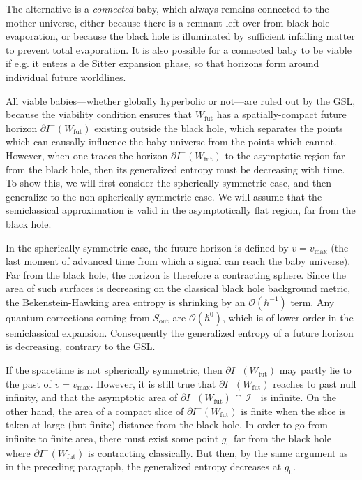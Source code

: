 \documentclass{article}
\begin{document}
The alternative is a \textit{connected} baby, which always remains connected to the mother universe, either because there is a remnant left over from black hole evaporation, or because the black hole is illuminated by sufficient infalling matter to prevent total evaporation.  It is also possible for a connected baby to be viable if e.g. it enters a de Sitter expansion phase, so that horizons form around individual future worldlines.

All viable babies---whether globally hyperbolic or not---are ruled out by the GSL, because the viability condition ensures that $W_\mathrm{fut}$ has a spatially-compact future horizon $\partial I^-(W_\mathrm{fut})$ existing outside the black hole, which separates the points which can causally influence the baby universe from the points which cannot.  However, when one traces the horizon $\partial I^-(W_\mathrm{fut})$ to the asymptotic region far from the black hole, then its generalized entropy must be decreasing with time.  To show this, we will first consider the spherically symmetric case, and then generalize to the non-spherically symmetric case.  We will assume that the semiclassical approximation is valid in the asymptotically flat region, far from the black hole.

In the spherically symmetric case, the future horizon is defined by $v = v_\mathrm{max}$ (the last moment of advanced time from which a signal can reach the baby universe).  Far from the black hole, the horizon is therefore a contracting sphere.  Since the area of such surfaces is decreasing on the classical black hole background metric, the Bekenstein-Hawking area entropy is shrinking by an $\mathcal{O}(\hbar^{-1})$ term.  Any quantum corrections coming from $S_\mathrm{out}$ are $\mathcal{O}(\hbar^{0})$, which is of lower order in the semiclassical expansion.  Consequently the generalized entropy of a future horizon is decreasing, contrary to the GSL.

If the spacetime is not spherically symmetric, then $\partial I^-(W_\mathrm{fut})$ may partly lie to the past of $v = v_\mathrm{max}$.  However, it is still true that $\partial I^-(W_\mathrm{fut})$ reaches to past null infinity, and that the asymptotic area of $\partial I^-(W_\mathrm{fut})\,\cap\,\mathcal{I}^-$ is infinite.  On the other hand, the area of a compact slice of $\partial I^-(W_\mathrm{fut})$ is finite when the slice is taken at large (but finite) distance from the black hole.  In order to go from infinite to finite area, there must exist some point $g_0$ far from the black hole where $\partial I^-(W_\mathrm{fut})$ is contracting classically.  But then, by the same argument as in the preceding paragraph, the generalized entropy decreases at $g_0$.
\end{document}
